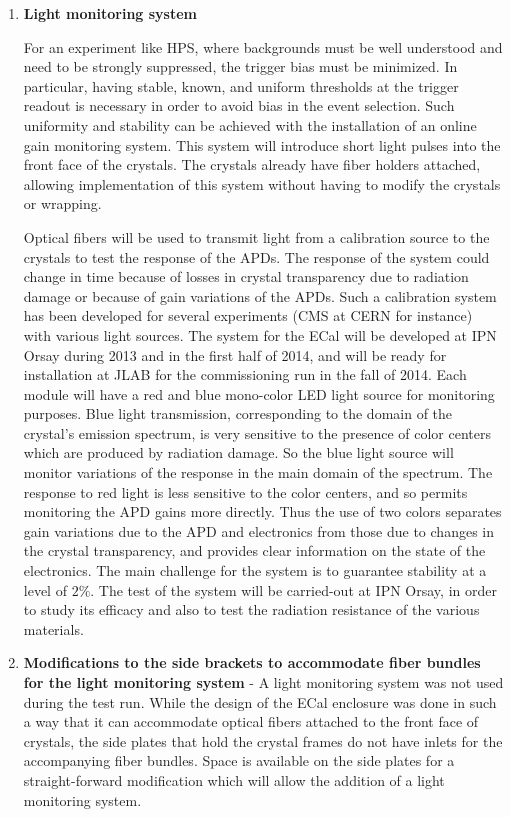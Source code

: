 \begin{enumerate}
\item {\bf Light monitoring system}

For an experiment like HPS, where backgrounds must be well understood and need to be strongly suppressed, the trigger bias must be minimized. In particular, having stable, known, and uniform thresholds at the trigger readout is necessary in order to avoid  bias in the 
event selection. Such uniformity and stability can be achieved with the installation of an online gain monitoring 
system. This system will introduce short light pulses into the front face of the crystals. The crystals already have fiber holders attached, allowing implementation of this system without having to modify the crystals or wrapping. 

Optical fibers will be used to transmit light from a calibration  source to the crystals to test the response of the APDs. The response of the system could change in time because of 
losses in crystal transparency due to radiation damage or because of gain variations of the APDs. 
Such a calibration system has been developed for several experiments (CMS at CERN for instance) with various light sources. The system for the ECal 
will be developed at IPN Orsay during 2013 and in the first half of 2014, and will be ready for installation at JLAB for the commissioning run in the fall of 2014. Each module will have a red and blue mono-color LED light source for monitoring purposes. 
Blue light transmission, corresponding to the domain of the crystal's emission spectrum, is very sensitive to the presence of color centers which are produced by radiation damage. So the blue light source will monitor variations of the response in the main domain of the spectrum.
The response to red light is less sensitive to the color centers,  and so permits monitoring the APD gains more directly. Thus the use of two colors separates gain variations due to the 
APD and electronics from those due to changes in the crystal transparency, and provides clear information on the state of the electronics. 
The main challenge for the system is to guarantee stability at a level of $2\%$. The test of the system will be carried-out at
IPN Orsay, in order to study its efficacy and also to test the radiation resistance of the various materials.

\item {\bf Modifications to the side brackets to accommodate fiber bundles for the light monitoring system} -
A light monitoring system was not used during the test run. While the design of the ECal enclosure was done in such a way that it can 
accommodate optical fibers attached to the front face of crystals, the side plates that hold the crystal frames do not have inlets for the accompanying fiber bundles.
Space is available on the side plates for a straight-forward modification which will allow the addition of a light monitoring system.  
    

\end{enumerate}

